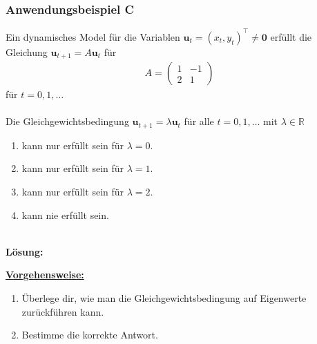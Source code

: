 \subsubsection*{Anwendungsbeispiel C}
Ein dynamisches Model für die Variablen $\textbf{u}_t = (x_t , y_t)^\top \neq \textbf{0}$ erfüllt die Gleichung
$\textbf{u}_{t+1} = A \textbf{u}_t$ für
\begin{align*}
A = 
\begin{pmatrix}
1 & -1\\
2 & 1
\end{pmatrix}
\end{align*}
für $t = 0,1,\dots$ \\
\\
Die Gleichgewichtsbedingung $\textbf{u}_{t+1} = \lambda \textbf{u}_t$ für alle $t = 0,1,\dots$ mit $\lambda \in \mathbb{R}$
\renewcommand{\labelenumi}{(\alph{enumi})}
\begin{enumerate}
\item 
kann nur erfüllt sein für $\lambda = 0$.
\item
kann nur erfüllt sein für $\lambda = 1$.
\item
kann nur erfüllt sein für $\lambda = 2$.
\item
kann nie erfüllt sein.
\end{enumerate}
\ \\
\textbf{Lösung:}
\begin{mdframed}
\underline{\textbf{Vorgehensweise:}}
\renewcommand{\labelenumi}{\theenumi.}
\begin{enumerate}
\item Überlege dir, wie man die Gleichgewichtsbedingung auf Eigenwerte zurückführen kann.
\item
Bestimme die korrekte Antwort.
\end{enumerate}
\end{mdframed}

